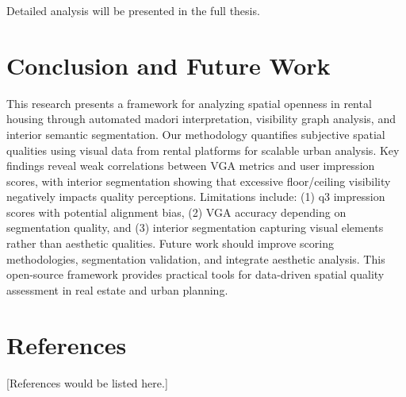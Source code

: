 \documentclass[11pt,a4paper]{article}
\begin{document}
\begin{multicols}{2}

Detailed analysis will be presented in the full thesis.



\section{Conclusion and Future Work}

This research presents a framework for analyzing spatial openness in rental housing through automated madori
interpretation, visibility graph analysis, and interior semantic segmentation. Our methodology quantifies subjective 
spatial qualities using visual data from rental platforms for scalable urban analysis. Key findings reveal weak 
correlations between VGA metrics and user impression scores, with interior segmentation showing that excessive 
floor/ceiling visibility negatively impacts quality perceptions. Limitations include: (1) q3 impression scores 
with potential alignment bias, (2) VGA accuracy depending on segmentation quality, and (3) interior segmentation 
capturing visual elements rather than aesthetic qualities. Future work should improve scoring methodologies, 
segmentation validation, and integrate aesthetic analysis. This open-source framework provides practical tools 
for data-driven spatial quality assessment in real estate and urban planning.

\section{References}

[References would be listed here.]

\end{multicols}

\newpage

\begin{multicols}{2}
\fontsize{11}{13}\selectfont


\end{multicols}

\newpage

\begin{multicols}{2}
\fontsize{11}{13}\selectfont


\end{multicols}
\end{document}
